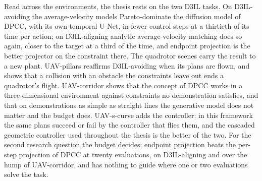 Read across the environments, the thesis rests on the two D3IL tasks. On D3IL-avoiding the average-velocity
models Pareto-dominate the diffusion model of \ac{DPCC}, with its own temporal U-Net, in fewer control steps
at a thirtieth of its time per action; on D3IL-aligning analytic average-velocity matching does so again,
closer to the target at a third of the time, and endpoint projection is the better projector on the
constraint there. The quadrotor scenes carry the result to a new plant. UAV-pillars reaffirms D3IL-avoiding
when its plans are flown, and shows that a collision with an obstacle the constraints leave out ends a
quadrotor's flight. UAV-corridor shows that the concept of \ac{DPCC} works in a three-dimensional environment
against constraints no demonstration satisfies, and that on demonstrations as simple as straight lines the
generative model does not matter and the budget does. UAV-s-curve adds the controller: in this framework the
same plans succeed or fail by the controller that flies them, and the cascaded geometric controller used
throughout the thesis is the better of the two. For the second research question the budget decides:
endpoint projection beats the per-step projection of \ac{DPCC} at twenty evaluations, on D3IL-aligning and
over the hump of UAV-corridor, and has nothing to guide where one or two evaluations solve the task.

